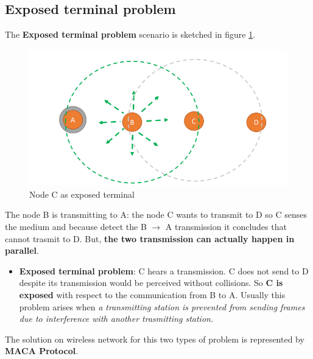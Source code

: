 \documentclass[10pt,a4paper]{report}
\theoremstyle{definition}
\begin{document}
\subsection{Exposed terminal problem}\label{sec:exposed-terminal-problem}
The \textbf{Exposed terminal problem} scenario is sketched in figure \ref{exposed-terminal}.
\begin{figure}[h!]
	\centering\includegraphics[scale=0.50]{images/Pasted image 20230225100636.png}
	\caption{Node C as exposed terminal}
	\label{exposed-terminal}
\end{figure}

The node B is transmitting to A: the node C wants to transmit to D so C senses the medium and because detect the B $\rightarrow$ A transmission it concludes that cannot trasmit to D. But, \textbf{the two transmission can actually happen in parallel}.
\begin{itemize}
	\item 
	\textbf{Exposed terminal problem}: C hears a transmission. C does not send to D despite its transmission would be perceived without collisions.  So \textbf{C is exposed} with respect to the communication from B to A.
	Usually this problem arises when \textit{a transmitting station is prevented from sending frames due to interference with another trasmitting station}.
\end{itemize}

The solution on wireless network for this two types of problem is represented by \textbf{MACA Protocol}.
\end{document}
